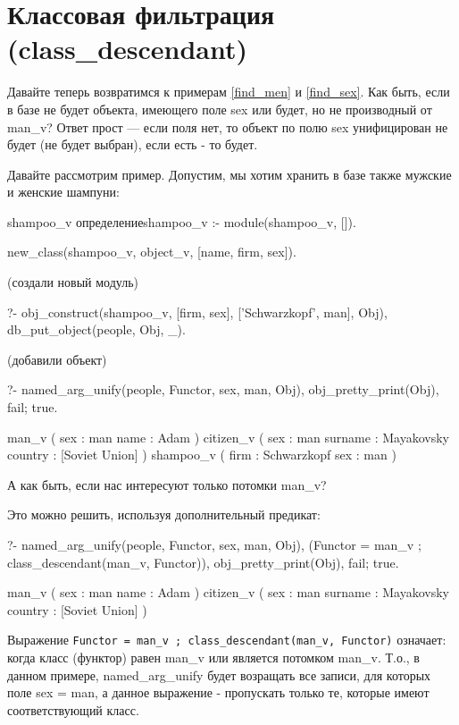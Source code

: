 \documentclass[a4paper]{book}
\begin{document}
\section{Классовая фильтрация (class_descendant)}
\label{class_descendant}

Давайте теперь возвратимся к примерам \ref{find_men} и
\ref{find_sex}. Как быть, если в базе не будет объекта, имеющего
поле sex или будет, но не производный от man_v? Ответ прост ---
если поля нет, то объект по полю sex унифицирован не будет (не
будет выбран), если есть - то будет.

Давайте рассмотрим пример. Допустим, мы хотим хранить в базе
также мужские и женские шампуни:

\begin{example}{shampoo_v определение}{shampoo_v}
:- module(shampoo_v, []).

new_class(shampoo_v, object_v, [name, firm, sex]).
\end{example}

(создали новый модуль)

\begin{example}{}{}
?- obj_construct(shampoo_v, [firm, sex], 
                 ['Schwarzkopf', man], Obj),
    db_put_object(people, Obj, _).
\end{example}

(добавили объект)

\begin{example}{}{}
?- named_arg_unify(people, Functor, sex, man, Obj), 
   obj_pretty_print(Obj), fail; true.

man_v ( 
  sex : man 
  name : Adam 
) 
citizen_v ( 
  sex : man 
  surname : Mayakovsky 
  country : [Soviet Union] 
) 
shampoo_v ( 
  firm : Schwarzkopf 
  sex : man 
) 
\end{example}

А как быть, если нас интересуют только потомки man_v?

Это можно решить, используя дополнительный предикат:

\begin{example}{}{}
?- named_arg_unify(people, Functor, sex, man, Obj), 
   (Functor = man_v ; class_descendant(man_v, Functor)), 
   obj_pretty_print(Obj), fail; true.

man_v ( 
  sex : man 
  name : Adam 
) 
citizen_v ( 
  sex : man 
  surname : Mayakovsky 
  country : [Soviet Union] 
) 
\end{example}

Выражение
\verb|Functor = man_v ; class_descendant(man_v, Functor)|
означает: когда класс (функтор) равен man_v или является
потомком man_v. Т.о., в данном примере, named_arg_unify будет
возращать все записи, для которых поле sex = man, а данное
выражение - пропускать только те, которые имеют соответствующий
класс. 
\end{document}
